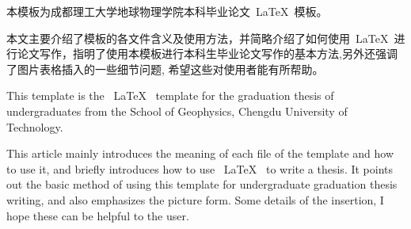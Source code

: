 \begin{cnabstract}
本模板为成都理工大学地球物理学院本科毕业论文~\LaTeX~模板。

本文主要介绍了模板的各文件含义及使用方法，并简略介绍了如何使用~\LaTeX~进行论文写作，指明了使用本模板进行本科生毕业论文写作的基本方法,另外还强调了图片表格插入的一些细节问题, 希望这些对使用者能有所帮助。
\end{cnabstract}
\vspace{1em}\par


\begin{enabstract}
This template is the ~\LaTeX~ template for the graduation thesis of undergraduates from the School of Geophysics, Chengdu University of Technology.

This article mainly introduces the meaning of each file of the template and how to use it, and briefly introduces how to use ~\LaTeX~ to write a thesis. It points out the basic method of using this template for undergraduate graduation thesis writing, and also emphasizes the picture form. Some details of the insertion, I hope these can be helpful to the user.
\end{enabstract}
\vspace{1em}\par



